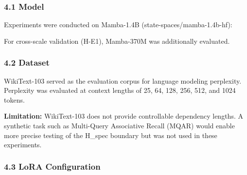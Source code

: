 
\subsubsection{4.1 Model}

Experiments were conducted on Mamba-1.4B (state-spaces/mamba-1.4b-hf):

\begin{table}[htbp]
\centering
{}
\end{table}

For cross-scale validation (H-E1), Mamba-370M was additionally evaluated.

\subsubsection{4.2 Dataset}

WikiText-103 served as the evaluation corpus for language modeling perplexity. Perplexity was evaluated at context lengths of 25, 64, 128, 256, 512, and 1024 tokens.

\textbf{Limitation:} WikiText-103 does not provide controllable dependency lengths. A synthetic task such as Multi-Query Associative Recall (MQAR) would enable more precise testing of the H\_spec boundary but was not used in these experiments.

\subsubsection{4.3 LoRA Configuration}

\begin{table}[htbp]
\centering
{}
\end{table}

